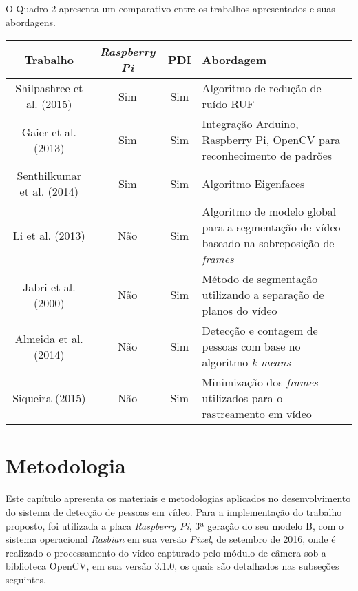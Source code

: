 \documentclass[12pt,oneside,a4paper,chapter=TITLE,section=TITLE,sumario=tradicional]{abntex2}
\begin{document}
O Quadro 2 apresenta um comparativo entre os trabalhos apresentados e suas abordagens.

\begin{quadro}[htb]
    \begin{tabular}{|c||c|c|p{4cm}|}
        \hline
        \textbf{Trabalho} & \textbf{\textit{Raspberry Pi}} & \textbf{PDI} & \textbf{Abordagem} \\ 
        \hline\hline
        Shilpashree et al. (2015) & Sim    & Sim   & Algoritmo de redução de ruído RUF   \\ \hline
        Gaier et al. (2013)  & Sim    & Sim   & Integração Arduino, Raspberry Pi, OpenCV para reconhecimento de padrões    \\ \hline
        Senthilkumar et al. (2014)   & Sim   & Sim  & Algoritmo Eigenfaces    \\ \hline
        Li et al. (2013)  & Não    & Sim  & Algoritmo de modelo global para a segmentação de vídeo  baseado na sobreposição de \textit{frames}   \\ \hline
        Jabri et al. (2000)  & Não    & Sim   & Método de segmentação utilizando a separação de planos do vídeo    \\ \hline
        Almeida et al. (2014)  & Não    & Sim   & Detecção e contagem de pessoas com base no algoritmo \textit{k-means}    \\ \hline
        Siqueira (2015) & Não   & Sim  & Minimização dos \textit{frames} utilizados para o rastreamento em vídeo    \\ \hline
    \end{tabular}
    
\end{quadro}

\chapter{Metodologia}
\label{cap:metodologia}

Este capítulo apresenta os materiais e metodologias aplicados no desenvolvimento do sistema de detecção de pessoas em vídeo. Para a implementação do trabalho proposto, foi utilizada a placa \textit{Raspberry Pi}, 3ª geração do seu modelo B, com o sistema operacional \textit{Rasbian} em sua versão \textit{Pixel}, de setembro de 2016, onde é realizado o processamento do vídeo capturado pelo módulo de câmera sob a biblioteca OpenCV, em sua versão 3.1.0, os quais são detalhados nas subseções seguintes.
\end{document}
